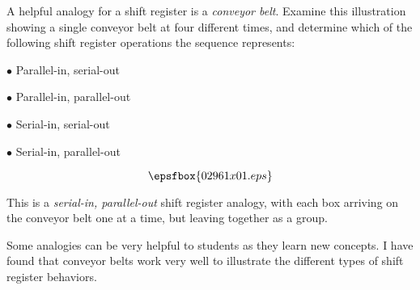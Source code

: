 

A helpful analogy for a shift register is a {\it conveyor belt}.  Examine this illustration showing a single conveyor belt at four different times, and determine which of the following shift register operations the sequence represents:

\medskip
\item{$\bullet$} Parallel-in, serial-out
\item{$\bullet$} Parallel-in, parallel-out
\item{$\bullet$} Serial-in, serial-out
\item{$\bullet$} Serial-in, parallel-out
\medskip

$$\epsfbox{02961x01.eps}$$







This is a {\it serial-in, parallel-out} shift register analogy, with each box arriving on the conveyor belt one at a time, but leaving together as a group.







Some analogies can be very helpful to students as they learn new concepts.  I have found that conveyor belts work very well to illustrate the different types of shift register behaviors.




